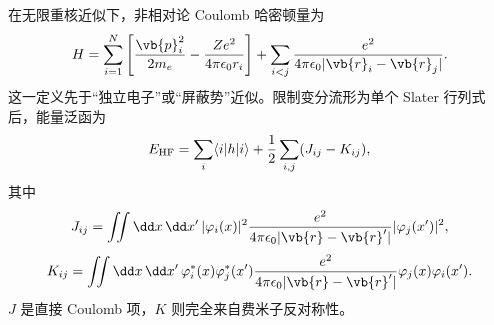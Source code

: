 在无限重核近似下，非相对论 Coulomb 哈密顿量为
\begin{equation}
H
=\sum_{i=1}^{N}
\left[
\frac{\vb{p}_i^2}{2m_e}
-\frac{Ze^2}{4\pi\epsilon_0r_i}
\right]
+\sum_{i<j}\frac{e^2}{4\pi\epsilon_0|\vb{r}_i-\vb{r}_j|}.
\label{eq:am-nelectron-hamiltonian}
\end{equation}
这一定义先于“独立电子”或“屏蔽势”近似。限制变分流形为单个 Slater 行列式后，能量泛函为
\begin{equation}
E_{\rm HF}
=\sum_i\langle i|h|i\rangle
+\frac12\sum_{i,j}(J_{ij}-K_{ij}),
\label{eq:am-hf-energy}
\end{equation}
其中
\[
J_{ij}
=\iint\dd x\,\dd x'\,
|\varphi_i(x)|^2
\frac{e^2}{4\pi\epsilon_0|\vb{r}-\vb{r}'|}
|\varphi_j(x')|^2,
\]
\[
K_{ij}
=\iint\dd x\,\dd x'\,
\varphi_i^*(x)\varphi_j^*(x')
\frac{e^2}{4\pi\epsilon_0|\vb{r}-\vb{r}'|}
\varphi_j(x)\varphi_i(x').
\]
$J$ 是直接 Coulomb 项，$K$ 则完全来自费米子反对称性。

